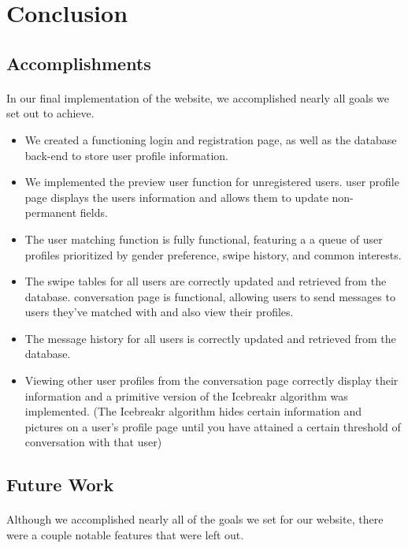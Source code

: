 \documentclass{article}
\begin{document}
    \section{Conclusion}
    \subsection{Accomplishments}
    \paragraph{}
    In our final implementation of the website, we accomplished nearly all goals we set out to achieve.
    \begin{itemize}
    \item We created a functioning login and registration page, as well as the database back-end to store user profile information.
    \item We implemented the preview user function for unregistered users.
    \itemThe user profile page displays the users information and allows them to update non-permanent fields.
    \item The user matching function is fully functional, featuring a a queue of user profiles prioritized by gender preference, swipe history, and common interests.
    \item The swipe tables for all users are correctly updated and retrieved from the database.
    \itemThe conversation page is functional, allowing users to send messages to users they've matched with and also view their profiles.
    \item The message history for all users is correctly updated and retrieved from the database.
    \item Viewing other user profiles from the conversation page correctly display their information and a primitive version of the Icebreakr algorithm was implemented. (The Icebreakr algorithm hides certain information and pictures on a user's profile page until you have attained a certain threshold of conversation with that user)
    \end{itemize}
    \subsection{Future Work}
    \paragraph{}
    Although we accomplished nearly all of the goals we set for our website, there were a couple notable features that were left out.
\end{document}
